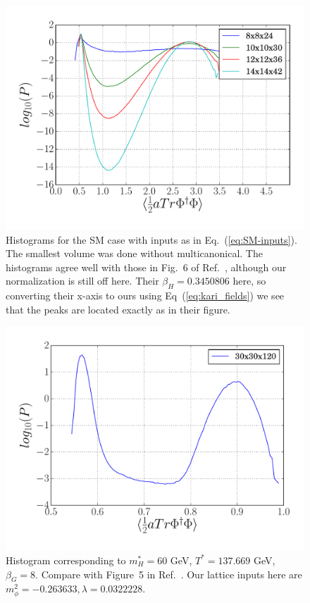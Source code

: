 \documentclass[11pt,a4paper]{article}
\begin{document}
\begin{figure}[H]
	\includegraphics[scale=0.5]{hgrams_beta8_mH35}
	\caption{Histograms for the SM case with inputs as in Eq.~(\ref{eq:SM-inputs}). The smallest volume was done without multicanonical. The histograms agree well with those in Fig.~6 of Ref.~\cite{Kajantie:1995kf}, although our normalization is still off here. Their $\beta_H = 0.3450806$ here, so converting their x-axis to ours using Eq~(\ref{eq:kari_fields}) we see that the peaks are located exactly as in their figure. }
\label{fig:SM_hgrams}
\end{figure}


\begin{figure}[H]
	\includegraphics[scale=0.5]{mH-60-beta-8}
	\caption{Histogram corresponding to $m^*_H = 60$ GeV, $T^* = 137.669$ GeV, $\beta_G = 8$. Compare with Figure~5 in Ref.~\cite{Kajantie:1995kf}. Our lattice inputs here are $m_\phi^2 = -0.263633, \lambda = 0.0322228$.}
\label{fig:mH60-hgram}
\end{figure}
\end{document}
